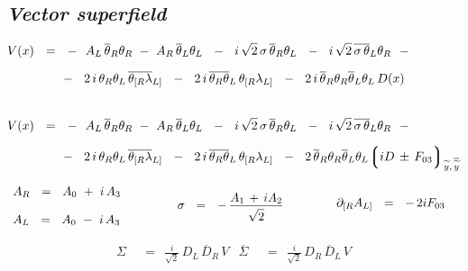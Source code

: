 \documentclass[14pt]{article}
\newcommand{\p}{\partial}
\newcommand{\wt}{\widetilde}
\newcommand{\ov}{\overline}
\newcommand{\lgr}{\left\lgroup}
\newcommand{\rgr}{\right\rgroup}
\begin{document}
\subsection*{\centering \it Vector superfield}
\begin{align*}
	V(x) & ~~=~~ -~~ A_L\, \ov\theta{}_R\theta_R  ~-~ A_R\, \ov\theta{}_L\theta_L  
                   ~~-~~ i\, \sqrt{2}\,\sigma\, \ov\theta{}_R\theta_L  
                   ~~-~~ i\, \sqrt{2}\, \ov{\sigma\, \theta}{}_L\theta_R
                   ~~-
	\\[2mm]
	& \phantom{~~=~~}
	             -~~ 2\,i\, \theta_R\theta_L\,\ov{\theta_{[R} \lambda}{}_{L]}  
                   ~~-~~  2\,i\, \ov{\theta_R\theta}{}_L\, \theta_{[R}\lambda_{L]}
	           ~~-~~ 2\,i\, \ov\theta{}_R\theta_R \ov\theta{}_L\theta_L\, D(x)
	\\ \\[2mm]
	V(x) & ~~=~~ -~~ A_L\, \ov\theta{}_R\theta_R  ~-~ A_R\, \ov\theta{}_L\theta_L  
                   ~~-~~ i\, \sqrt{2}\,\sigma\, \ov\theta{}_R\theta_L  
                   ~~-~~ i\, \sqrt{2}\, \ov{\sigma\, \theta}{}_L\theta_R
                   ~~-
	\\[2mm]
	& \phantom{~~=~~}
	             -~~ 2\,i\, \theta_R\theta_L\,\ov{\theta_{[R} \lambda}{}_{L]}  
                   ~~-~~  2\,i\, \ov{\theta_R\theta}{}_L\, \theta_{[R}\lambda_{L]}
	           ~~-~~ 2\, \ov\theta{}_R\theta_R \ov\theta{}_L\theta_L\, \!\! \lgr iD \,\pm\, F_{03} \rgr_{\wt y,\, {\ov{\wt y}}}
\end{align*}

\begin{equation*}
\begin{array}{lll}
	A_R       ~~=~~    A_0  ~+~  i\,A_3
	&
	\qquad\quad
	\raisebox{-1.5ex}{
		\multirow{2}{*}{
		$ \sigma    ~~=~~    -\, \frac{\raisebox{0.5ex}{$\displaystyle A_1 \,+\, i A_2$}}
							{\raisebox{-1.4ex}{$ \displaystyle \sqrt 2$}} $
		}
	}
	&
	\qquad
	\raisebox{-0.8ex}{
		\multirow{2}{*}{
	 	   $ \p_{[R} A_{L]}    ~~=~~    -\, 2i F_{03} $
		}
	}
	\\[4mm]
	A_L       ~~=~~    A_0  ~-~  i\,A_3
\end{array}
\end{equation*}

\begin{align*}
	\Sigma    & ~~=~~    \frac{i}{\sqrt 2}\, D_L\, \ov D{}_R\, V
	&
	\ov \Sigma    & ~~=~~    \frac{i}{\sqrt 2}\, D_R\, \ov D{}_L\, V
\end{align*}
\end{document}
